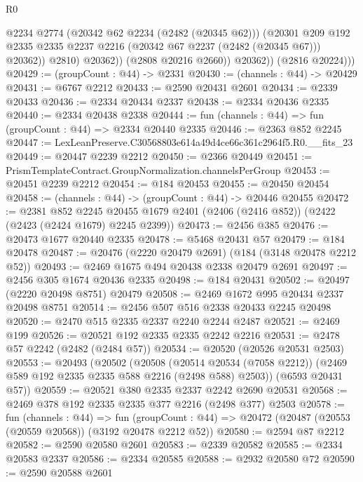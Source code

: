 \begin{lexlean}{R0}
\begin{coremodule}
                      @2234
                      @2774
                      (@20342 @62 @2234 (@2482 (@20345 @62)))
                      (@20301
                        @209
                        @192
                        @2335
                        @2335
                        @2237
                        @2216
                        (@20342 @67 @2237 (@2482 (@20345 @67)))
                        @20362))
                    @2810)
                  @20362))
              (@2808 @20216 @2660))
            @20362))
        (@2816 @20224)))
@20429 := (groupCount : @44) -> @2331
@20430 := (channels : @44) -> @20429
@20431 := @6767 @2212
@20433 := @2590 @20431 @2601
@20434 := @2339 @20433
@20436 := @2334 @20434 @2337
@20438 := @2334 @20436 @2335
@20440 := @2334 @20438 @2338
@20444 := fun (channels : @44) => fun (groupCount : @44) => @2334 @20440 @2335
@20446 := @2363 @852 @2245
@20447 := LexLeanPreserve.C30568803e614a49d4ce66c361c2964f5.R0.__fits_23
@20449 := @20447 @2239 @2212
@20450 := @2366 @20449
@20451 := PrismTemplateContract.GroupNormalization.channelsPerGroup
@20453 := @20451 @2239 @2212
@20454 := @184 @20453
@20455 := @20450 @20454
@20458 := (channels : @44) -> (groupCount : @44) -> @20446 @20455
@20472 := @2381
    @852
    @2245
    @20455
    @1679
    @2401
    (@2406 (@2416 @852))
    (@2422 (@2423 (@2424 @1679) @2245 @2399))
@20473 := @2456 @385
@20476 := @20473 @1677 @20440 @2335
@20478 := @5468 @20431 @57
@20479 := @184 @20478
@20487 := @20476 (@2220 @20479 @2691) (@184 (@3148 @20478 @2212 @52))
@20493 := @2469 @1675 @494 @20438 @2338 @20479 @2691
@20497 := @2456 @305 @1674 @20436 @2335
@20498 := @184 @20431
@20502 := @20497 (@2220 @20498 @8751) @20479
@20508 := @2469 @1672 @995 @20434 @2337 @20498 @8751
@20514 := @2456 @507 @516 @2338 @20433 @2245 @20498
@20520 := @2470 @515 @2335 @2337 @2240 @2244 @2487
@20521 := @2469 @199
@20526 := @20521 @192 @2335 @2335 @2242 @2216
@20531 := @2478 @57 @2242 (@2482 (@2484 @57))
@20534 := @20520 (@20526 @20531 @2503)
@20553 := @20493
    (@20502
      (@20508
        (@20514 @20534 (@7058 @2212))
        (@2469 @589 @192 @2335 @2335 @588 @2216 (@2498 @588) @2503))
      (@6593 @20431 @57))
@20559 := @20521 @380 @2335 @2337 @2242 @2690 @20531
@20568 := @2469 @378 @192 @2335 @2335 @377 @2216 (@2498 @377) @2503
@20578 := fun (channels : @44) =>
  fun (groupCount : @44) => @20472 (@20487 (@20553 (@20559 @20568)) (@3192 @20478 @2212 @52))
@20580 := @2594 @87 @2212
@20582 := @2590 @20580 @2601
@20583 := @2339 @20582
@20585 := @2334 @20583 @2337
@20586 := @2334 @20585
@20588 := @2932 @20580 @72
@20590 := @2590 @20588 @2601

\end{coremodule}
\end{lexlean}
